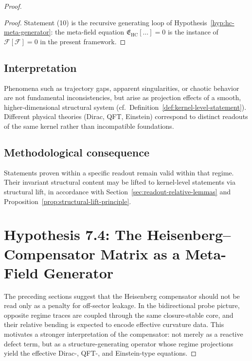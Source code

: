 \begin{proof}
\begin{proof}
Statement (10) is the recursive generating loop of
Hypothesis~\ref{hyp:hc-meta-generator}: the meta-field equation
$\mathfrak{E}_{\mathrm{HC}}[\ldots] = 0$ is the instance of
$\mathcal{F}[\mathcal{F}] = 0$ in the present framework.
\end{proof}

\subsection*{Interpretation}

Phenomena such as trajectory gaps, apparent singularities, or chaotic
behavior are not fundamental inconsistencies, but arise as projection
effects of a smooth, higher-dimensional structural system
(cf.\ Definition~\ref{def:kernel-level-statement}). Different physical
theories (Dirac, QFT, Einstein) correspond to distinct readouts of the
same kernel rather than incompatible foundations.

\subsection*{Methodological consequence}

Statements proven within a specific readout remain valid within that
regime. Their invariant structural content may be lifted to kernel-level
statements via structural lift, in accordance with
Section~\ref{sec:readout-relative-lemmas} and
Proposition~\ref{prop:structural-lift-principle}.


\section{Hypothesis 7.4: The Heisenberg--Compensator Matrix as a Meta-Field Generator}
\label{sec:hc-meta-field-generator}

The preceding sections suggest that the Heisenberg compensator should not
be read only as a penalty for off-sector leakage. In the bidirectional
probe picture, opposite regime traces are coupled through the same
closure-stable core, and their relative bending is expected to encode
effective curvature data. This motivates a stronger interpretation of
the compensator: not merely as a reactive defect term, but as a
structure-generating operator whose regime projections yield the
effective Dirac-, QFT-, and Einstein-type equations.


\end{proof}

